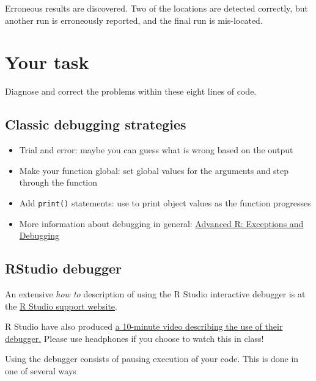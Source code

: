 \documentclass[]{article}
\begin{document}
Erroneous results are discovered. Two of the locations are detected
correctly, but another run is erroneously reported, and the final run is
mis-located.

\section{Your task}\label{your-task}

Diagnose and correct the problems within these eight lines of code.

\subsection{Classic debugging
strategies}\label{classic-debugging-strategies}

\begin{itemize}
\item
  Trial and error: maybe you can guess what is wrong based on the output
\item
  Make your function global: set global values for the arguments and
  step through the function
\item
  Add \texttt{print()} statements: use to print object values as the
  function progresses
\item
  More information about debugging in general:
  \href{http://adv-r.had.co.nz/Exceptions-Debugging.html}{Advanced R:
  Exceptions and Debugging}
\end{itemize}

\subsection{RStudio debugger}\label{rstudio-debugger}

An extensive \emph{how to} description of using the R Studio interactive
debugger is at the
\href{https://support.rstudio.com/hc/en-us/articles/205612627-Debugging-with-RStudio}{R
Studio support website}.

R Studio have also produced \href{https://vimeo.com/99375765}{a
10-minute video describing the use of their debugger.} Please use
headphones if you choose to watch this in class!

Using the debugger consists of pausing execution of your code. This is
done in one of several ways
\end{document}
